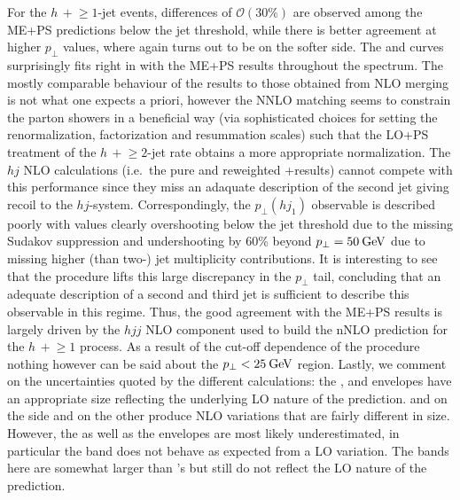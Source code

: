For the $h\,+\!\ge\!\!1$-jet events, differences of $\mathcal{O}(30\%)$ are
observed among the ME+PS predictions below the jet threshold, while
there is better agreement at higher $p_\perp$ values, where again
\Herwig turns out to be on the softer side. The \Powheg and \Sherpa \NNLOPS 
curves surprisingly fits right in with the ME+PS results throughout 
the spectrum. The mostly comparable
behaviour of the \NNLOPS results to those obtained from NLO merging is
not what one expects a priori, however the NNLO matching seems to
constrain the parton showers in a beneficial way (via sophisticated
choices for setting the renormalization, factorization and resummation
scales) such that the LO+PS treatment of the $h\,+\!\ge\!2$-jet rate
obtains a more appropriate normalization. The $hj$ NLO calculations
(i.e.~the pure and \Minlo reweighted \GoSam{}+\Sherpa results) cannot
compete with this performance since they miss an adaquate description 
of the second jet giving recoil to the $hj$-system.
Correspondingly, the $p_\perp(hj_1)$ observable is described poorly
with values clearly overshooting below the jet threshold due to the
missing Sudakov suppression and undershooting by 60\% beyond
$p_\perp=50\text{\:GeV}$ due to missing higher (than two-) jet multiplicity
contributions. It is interesting to see that the \Loopsim procedure
lifts this large discrepancy in the $p_\perp$ tail, concluding that 
an adequate description of a second and third jet is sufficient to 
describe this observable in this regime. Thus, the good agreement
with the ME+PS results is largely driven by the $hjj$ NLO component
used to build the nNLO prediction for the $h\,+\!\ge\!\!1$ process. As a
result of the cut-off dependence of the procedure nothing however can
be said about the $p_\perp<25\text{\:GeV}$ region. Lastly, we comment on the
uncertainties quoted by the different calculations: the \GoSam, \Minlo
and \Loopsim envelopes have an appropriate size reflecting the
underlying LO nature of the prediction. \MGaMC and \Sherpa \MEPSatNLO 
on the side and \Herwig on the other produce NLO variations that are
fairly different in size. However, the \Herwig as well as the \Powheg
envelopes are most likely underestimated, in particular the \Powheg
band does not behave as expected from a LO variation. The \Sherpa 
\NNLOPS bands here are somewhat larger than \Powheg's but still do not 
reflect the LO nature of the prediction.

